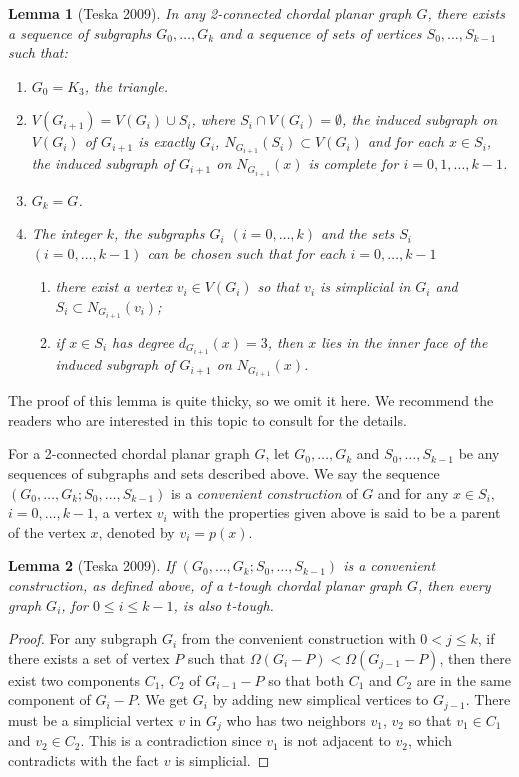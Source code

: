 \documentclass[12pt]{report}
\newtheorem{lemma}{Lemma}
\begin{document}
\begin{lemma}[Teska 2009]\label{lm21intes09}
In any 2-connected chordal planar graph $G$, there exists a sequence of subgraphs $G_0,\ldots,G_k$ and a sequence of sets of vertices $S_0,\ldots,S_{k-1}$ such that:
\begin{enumerate}
\item $G_0=K_3$, the triangle.
\item $V(G_{i+1})=V(G_i)\cup S_i$, where $S_i\cap V(G_i)=\emptyset$, the induced subgraph on $V(G_i)$ of $G_{i+1}$ is exactly $G_i$, $N_{G_{i+1}}(S_i)\subset V(G_i)$ and for each $x\in S_i$, the induced subgraph of $G_{i+1}$ on $N_{G_{i+1}}(x)$ is complete for $i=0,1,\ldots,k-1$.
\item $G_k=G$.
\item The integer $k$, the subgraphs $G_i$ $(i=0,\ldots,k)$ and the sets $S_i$ $(i=0,\ldots,k-1)$ can be chosen such that for each $i=0,\ldots,k-1$
\begin{enumerate}
\item there exist a vertex $v_i\in V(G_i)$ so that $v_i$ is simplicial in $G_i$ and $S_i\subset N_{G_{i+1}}(v_i)$;
\item if $x\in S_i$ has degree $d_{G_{i+1}}(x)=3$, then $x$ lies in the inner face of the induced subgraph of $G_{i+1}$ on $N_{G_{i+1}}(x)$.
\end{enumerate}
\end{enumerate}
\end{lemma}

The proof of this lemma is quite thicky, so we omit it here. We recommend the readers who are interested in this topic to consult \cite{teska20092} for the details.

For a 2-connected chordal planar graph  $G$, let $G_0,\ldots,G_k$ and $S_0,\ldots,S_{k-1}$ be any sequences of subgraphs and sets described above. We say the sequence $(G_0,\ldots,G_k;S_0,\ldots,S_{k-1})$ is a {\em convenient construction} of $G$ and for any $x\in S_i$, $i=0,\ldots,k-1$, a vertex $v_i$ with the properties given  above is said to be a parent of the vertex $x$, denoted by $v_i=p(x)$. 

\begin{lemma}[Teska 2009]\label{lm22intes09}
If $(G_0,\ldots,G_k;S_0,\ldots,S_{k-1})$ is a convenient construction, as defined above, of a $t$-tough chordal planar graph $G$, then every graph $G_i$, for $0\le i\le k-1$, is also $t$-tough.
\end{lemma}

\begin{proof}
For any subgraph $G_i$ from the convenient construction with $0<j\le k$, if there exists a set of vertex $P$ such that $\Omega(G_i-P)<\Omega(G_{j-1}-P)$, then there exist two components $C_1$, $C_2$ of $G_{i-1}-P$ so that both $C_1$ and $C_2$ are in the same component of $G_i-P$. We get $G_i$ by adding new simplical vertices to $G_{j-1}$. There must be a simplicial vertex $v$ in $G_j$ who has two neighbors $v_1$, $v_2$ so that $v_1\in C_1$ and $v_2\in C_2$. This is a contradiction since $v_1$ is not adjacent to $v_2$, which contradicts with the fact $v$ is simplicial.
\end{proof}
\end{document}
